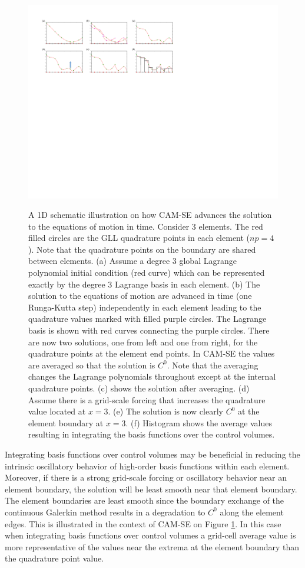 \documentclass[twocol]{ametsoc}
\begin{document}
\begin{figure}[t]
\noindent\includegraphics[width=38pc,angle=0]{figs/se-schematic.pdf}\\
\caption{A 1D schematic illustration on how CAM-SE advances the solution to the equations of motion in time. Consider 3 elements. The red filled circles are the GLL quadrature points in each element ($np=4$). Note that the quadrature points on the boundary are shared between elements. (a) Assume a degree 3 global Lagrange polynomial initial condition (red curve) which can be represented exactly by the degree 3 Lagrange basis in each element. (b) The solution to the equations of motion are advanced in time (one Runga-Kutta step) independently in each element leading to the quadrature values marked with filled purple circles. The Lagrange basis is shown with red curves connecting the purple circles. There are now two solutions, one from left and one from right, for the quadrature points at the element end points. In CAM-SE the values are averaged so that the solution is $C^0$. Note that the averaging changes the Lagrange polynomials throughout except at the internal quadrature points. (c) shows the solution after averaging. (d) Assume there is a grid-scale forcing that increases the quadrature value located at $x=3$. (e) The solution is now clearly $C^0$ at the element boundary at $x=3$. (f) Histogram shows the average values resulting in integrating the basis functions over the control volumes.}
\label{fig:se-schematic}
\end{figure}

Integrating basis functions over control volumes may be beneficial in reducing the intrinsic oscillatory behavior of high-order basis functions within each element. Moreover, if there is a strong grid-scale forcing or oscillatory behavior near an element boundary, the solution will be least smooth near that element boundary. The element boundaries are least smooth since the boundary exchange of the continuous Galerkin method results in a degradation to $C^0$ along the element edges. This is illustrated in the context of CAM-SE on Figure \ref{fig:se-schematic}. In this case when integrating basis functions over control volumes a grid-cell average value is more representative of the values near the extrema at the element boundary than the quadrature point value.
\end{document}
